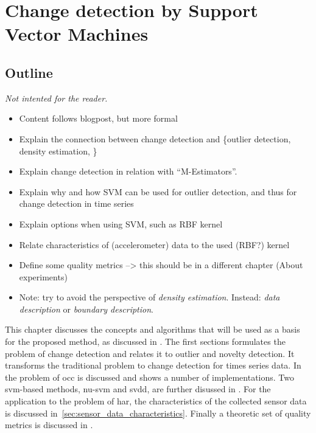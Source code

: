 
\chapter{Change detection by Support Vector Machines}

\label{Chapter3} %


\section{Outline}
\emph{Not intented for the reader.}
\begin{itemize}
  \item Content follows blogpost, but more formal
  \item Explain the connection between change detection and \{outlier detection, density estimation, \etc\}
  \item Explain change detection in relation with ``M-Estimators''.
  \item Explain why and how SVM can be used for outlier detection, and thus for change detection in time series
  \item Explain options when using SVM, such as RBF kernel
  \item Relate characteristics of (accelerometer) data to the used (RBF?) kernel
  \item Define some quality metrics --> this should be in a different chapter (About experiments)
  \item Note: try to avoid the perspective of \emph{density estimation}. Instead: \emph{data description} or \emph{boundary description}.
\end{itemize}

This chapter discusses the concepts and algorithms that will be used as a basis for the proposed method, as discussed in .
The first sections formulates the problem of change detection and relates it to outlier and novelty detection.
It transforms the traditional problem to change detection for times series data.
In  the problem of \acrlong{occ} is discussed and shows a number of implementations.
Two \acrlong{svm}-based methods, \gls{nu-svm} and \gls{svdd}, are further disussed in .
For the application to the problem of \acrlong{har}, the characteristics of the collected sensor data is discussed in~\ref{sec:sensor_data_characteristics}.
Finally a theoretic set of quality metrics is discussed in .





